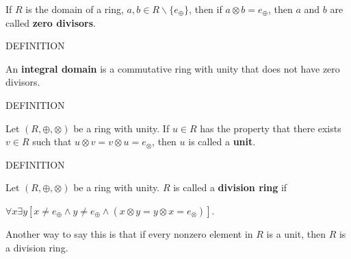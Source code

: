 \documentclass[12pt, a4paper]{article}
\begin{document}
\vspace{4mm}

If $R$ is the domain of a ring, $a,b\in R\backslash\{e_{\oplus}\}$, then if $a\otimes b=e_{\oplus}$, then $a$ and $b$ are called \textbf{zero divisors}.\par

\vspace{4mm}

\noindent\blacksquare\rm\hspace{2mm}DEFINITION\par

\vspace{4mm}

An \textbf{integral domain} is a commutative ring with unity that does not have zero divisors.\par

\vspace{4mm}

\noindent\blacksquare\rm\hspace{2mm}DEFINITION\par

\vspace{4mm}

Let $(R,\oplus,\otimes)$ be a ring with unity. If $u\in R$ has the property that there exists $v\in R$ such that $u\otimes v=v\otimes u=e_{\otimes}$, then $u$ is called a \textbf{unit}.

\vspace{4mm}

\noindent\blacksquare\rm\hspace{2mm}DEFINITION\par

\vspace{4mm}

Let $(R,\oplus,\otimes)$ be a ring with unity. $R$ is called a \textbf{division ring} if\par

\begin{description}

\item $\forall x\exists y[x\neq e_{\oplus}\wedge y\neq e_{\oplus}\wedge (x\otimes y=y\otimes x=e_{\otimes})]$.

\end{description}

\noindent Another way to say this is that if every nonzero element in $R$ is a unit, then $R$ is a division ring.

\vspace{4mm}
\end{document}
